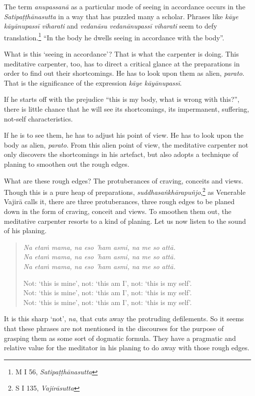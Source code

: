 The term \emph{anupassanā} as a particular mode of seeing in accordance occurs in the \emph{Satipaṭṭhānasutta} in a way that has puzzled many a scholar. Phrases like \emph{kāye kāyānupassī viharati} and \emph{vedanāsu vedanānupassī viharati} seem to defy translation.\footnote{M I 56, \emph{Satipaṭṭhānasutta}} ``In the body he dwells seeing in accordance with the body''.

What is this `seeing in accordance'? That is what the carpenter is doing. This meditative carpenter, too, has to direct a critical glance at the preparations in order to find out their shortcomings. He has to look upon them as alien, \emph{parato}. That is the significance of the expression \emph{kāye kāyānupassī}.

If he starts off with the prejudice ``this is my body, what is wrong with this?'', there is little chance that he will see its shortcomings, its impermanent, suffering, not-self characteristics.

If he is to see them, he has to adjust his point of view. He has to look upon the body as alien, \emph{parato}. From this alien point of view, the meditative carpenter not only discovers the shortcomings in his artefact, but also adopts a technique of planing to smoothen out the rough edges.

What are these rough edges? The protuberances of craving, conceits and views. Though this is a pure heap of preparations, \emph{suddhasaṅkhārapuñjo},\footnote{S I 135, \emph{Vajirāsutta}} as Venerable Vajirā calls it, there are three protuberances, three rough edges to be planed down in the form of craving, conceit and views. To smoothen them out, the meditative carpenter resorts to a kind of planing. Let us now listen to the sound of his planing.

\begin{quote}
\emph{Na etaṁ mama, na eso 'ham asmi, na me so attā.}\\
\emph{Na etaṁ mama, na eso 'ham asmi, na me so attā.}\\
\emph{Na etaṁ mama, na eso 'ham asmi, na me so attā.}

Not: `this is mine', not: `this am I', not: `this is my self'.\\
Not: `this is mine', not: `this am I', not: `this is my self'.\\
Not: `this is mine', not: `this am I', not: `this is my self'.
\end{quote}

It is this sharp `not', \emph{na}, that cuts away the protruding defilements. So it seems that these phrases are not mentioned in the discourses for the purpose of grasping them as some sort of dogmatic formula. They have a pragmatic and relative value for the meditator in his planing to do away with those rough edges.

